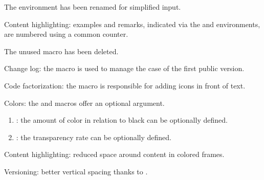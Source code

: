 \documentclass{tutodoc}
\begin{document}
\small

\begin{tdocbreak}
    \item The  environment has been renamed  for simplified input.

    \item Content highlighting: examples and remarks, indicated via the  and  environments, are numbered using a common counter.

    \item The unused macro  has been deleted.
\end{tdocbreak}


\begin{tdocnew}
    \item Change log: the  macro is used to manage the case of the first public version.

    \item Code factorization: the  macro is responsible for adding icons in front of text.
\end{tdocnew}


\begin{tdocupdate}
    \item Colors: the  and  macros offer an optional argument.
    \begin{enumerate}
        \item {}: the amount of color in relation to black can be optionally defined.

        \item {}: the transparency rate can be optionally defined.
    \end{enumerate}

    \item Content highlighting: reduced space around content in colored frames.

    \item Versioning: better vertical spacing thanks to .
\end{tdocupdate}
\end{document}

